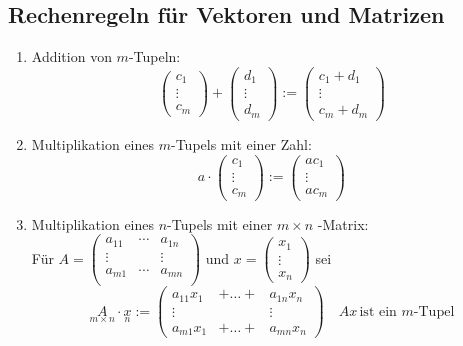 \subsection{Rechenregeln für Vektoren und Matrizen}

\begin{enumerate}

\item Addition von \( m \)-Tupeln:
\[
\begin{pmatrix}
c_1 \\ \vdots \\ c_m
\end{pmatrix}
+ 
\begin{pmatrix}
d_1 \\ \vdots \\ d_m
\end{pmatrix}
:= 
\begin{pmatrix}
c_1  +  d_1\\ 
 \vdots  \\ 
c_m  +  d_m
\end{pmatrix}
\]

\item Multiplikation eines \( m \)-Tupels mit einer Zahl:
\[
a \cdot 
\begin{pmatrix}
c_1 \\ \vdots \\ c_m
\end{pmatrix}
:=
\begin{pmatrix}
a c_1 \\ \vdots \\ a c_m
\end{pmatrix}
\]

\item Multiplikation eines \( n \)-Tupels mit einer \( m \times n \) -Matrix: \\
Für \( A= \begin{pmatrix}
a_{11} & \cdots &  a_{1n} \\
 \vdots & & \vdots \\ 
a_{m1} & \cdots &  a_{mn} \\
\end{pmatrix}
\) und \(
x= \begin{pmatrix}
x_1 \\ \vdots \\ x_n
\end{pmatrix}
\) sei
\[
\underset{m \times n}{A} \cdot \underset{n}{x} := 
\begin{pmatrix}
a_{11} x_1 & +  \ldots  + & a_{1n} x_n \\
 \vdots &  & \vdots \\ 
a_{m1} x_1 & +  \ldots  + & a_{mn} x_n 
\end{pmatrix}
\quad Ax \, \text{ist ein \(m\)-Tupel}
\]

\end{enumerate}


